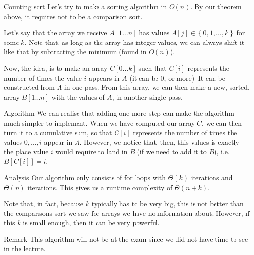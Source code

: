 \documentclass[a4paper]{article}
\begin{document}
\begin{parag}{Counting sort}
    Let's try to make a sorting algorithm in $O\left(n\right)$. By our theorem above, it requires not to be a comparison sort.

    Let's say that the array we receive $A\left[1\ldots n\right]$ has values $A\left[j\right] \in \left\{0, 1, \ldots, k\right\}$ for some $k$. Note that, as long as the array has integer values, we can always shift it like that by subtracting the minimum (found in $O\left(n\right)$). 

    Now, the idea, is to make an array $C\left[0\ldots k\right]$ such that $C\left[i\right]$ represents the number of times the value $i$ appears in $A$ (it can be 0, or more). It can be constructed from $A$ in one pass. From this array, we can then make a new, sorted, array $B\left[1 \ldots n\right]$ with the values of $A$, in another single pass.

    \begin{subparag}{Algorithm}
        We can realise that adding one more step can make the algorithm much simpler to implement. When we have computed our array $C$, we can then turn it to a cumulative sum, so that $C\left[i\right]$ represents the number of times the values $0, \ldots, i$ appear in $A$. However, we notice that, then, this values is exactly the place value $i$ would require to land in $B$ (if we need to add it to $B$), i.e. $B\left[C\left[i\right]\right] = i$.

    \end{subparag}
    
    \begin{subparag}{Analysis}
        Our algorithm only consists of for loops with $\Theta\left(k\right)$ iterations and $\Theta\left(n\right)$ iterations. This gives us a runtime complexity of $\Theta\left(n + k\right)$.

        Note that, in fact, because $k$ typically has to be very big, this is not better than the comparisons sort we saw for arrays we have no information about. However, if this $k$ is small enough, then it can be very powerful.
    \end{subparag}
    
    \begin{subparag}{Remark}
        This algorithm will not be at the exam since we did not have time to see in the lecture.
    \end{subparag}
    
\end{parag}
\end{document}
